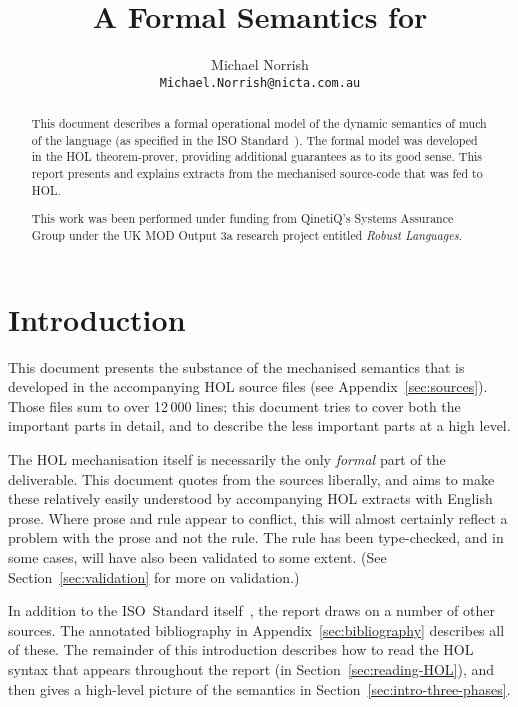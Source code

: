 \documentclass[11pt]{article}
\title{A Formal Semantics for \cpp}
\author{Michael Norrish\\{\small \texttt{Michael.Norrish@nicta.com.au}}}
\date{}
\begin{document}
\maketitle
\begin{abstract}
  This document describes a formal operational model of the dynamic
  semantics of much of the \cpp{} language (as specified in the ISO
  Standard~\cite{cpp-standard-iso14882}).  The formal model was
  developed in the HOL theorem-prover, providing additional guarantees
  as to its good sense.  This report presents and explains extracts
  from the mechanised source-code that was fed to HOL.

  This work was been performed under funding from QinetiQ's Systems
  Assurance Group under the UK MOD Output 3a research project entitled
  \emph{Robust Languages}.
\end{abstract}

\tableofcontents
\listoffigures

\section{Introduction}

This document presents the substance of the mechanised \cpp{}
semantics that is developed in the accompanying HOL source files (see
Appendix~\ref{sec:sources}).  Those files sum to over 12$\,$000 lines;
this document tries to cover both the important parts in detail, and
to describe the less important parts at a high level.

The HOL mechanisation itself is necessarily the only \emph{formal}
part of the deliverable.  This document quotes from the sources
liberally, and aims to make these relatively easily understood by
accompanying HOL extracts with English prose.  Where prose and rule
appear to conflict, this will almost certainly reflect a problem with
the prose and not the rule.  The rule has been type-checked, and in
some cases, will have also been validated to some extent.  (See
Section~\ref{sec:validation} for more on validation.)

In addition to the ISO~Standard itself~\cite{cpp-standard-iso14882},
the report draws on a number of other sources.  The annotated
bibliography in Appendix~\ref{sec:bibliography} describes all of
these.  The remainder of this introduction describes how to read the
HOL syntax that appears throughout the report (in
Section~\ref{sec:reading-HOL}), and then gives a high-level picture of
the \cpp{} semantics in Section~\ref{sec:intro-three-phases}.
\end{document}
